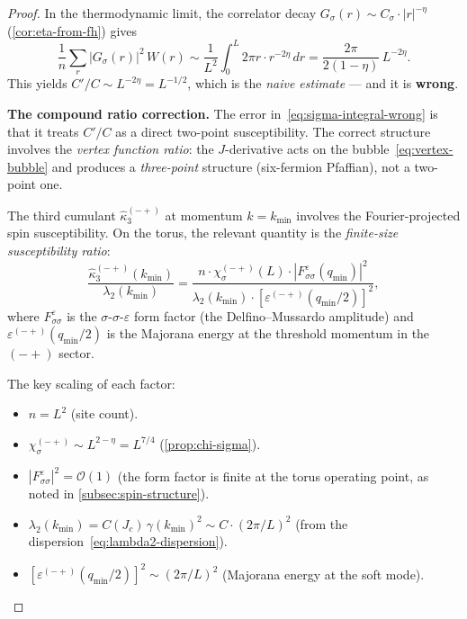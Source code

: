 \documentclass[11pt]{article}
\theoremstyle{definition}
\theoremstyle{remark}
\newcommand{\Jc}{J_c}
\newcommand{\cO}{\mathcal{O}}
\begin{document}
\begin{proof}
In the thermodynamic limit, the correlator decay
$G_\sigma(r) \sim C_\sigma \cdot |r|^{-\eta}$
(\cref{cor:eta-from-fh}) gives
\begin{equation}
  \frac{1}{n}\sum_r |G_\sigma(r)|^2\,W(r)
    \sim \frac{1}{L^2}\int_0^L 2\pi r\cdot
    r^{-2\eta}\,dr = \frac{2\pi}{2(1-\eta)}\,
    L^{-2\eta}.
  \label{eq:sigma-integral-wrong}
\end{equation}
This yields $C'/C \sim L^{-2\eta} = L^{-1/2}$, which is
the \emph{naive estimate} --- and it is \textbf{wrong}.

\textbf{The compound ratio correction.}
The error in~\eqref{eq:sigma-integral-wrong} is that it
treats $C'/C$ as a direct two-point susceptibility. The
correct structure involves the \emph{vertex function ratio}:
the $J$-derivative acts on the bubble~\eqref{eq:vertex-bubble}
and produces a \emph{three-point} structure (six-fermion
Pfaffian), not a two-point one.

The third cumulant $\hat{\kappa}_3^{(-+)}$ at momentum
$k = k_{\min}$ involves the Fourier-projected spin
susceptibility. On the torus, the relevant quantity is the
\emph{finite-size susceptibility ratio}:
\begin{equation}
  \frac{\hat{\kappa}_3^{(-+)}(k_{\min})}{\lambda_2(k_{\min})}
    = \frac{n \cdot \chi_\sigma^{(-+)}(L) \cdot
    |F_{\sigma\sigma}^\varepsilon(q_{\min})|^2}
    {\lambda_2(k_{\min}) \cdot
    [\varepsilon^{(-+)}(q_{\min}/2)]^2},
  \label{eq:vertex-ratio}
\end{equation}
where $F_{\sigma\sigma}^\varepsilon$ is the
$\sigma$-$\sigma$-$\varepsilon$ form factor (the
Delfino--Mussardo amplitude) and
$\varepsilon^{(-+)}(q_{\min}/2)$ is the Majorana energy
at the threshold momentum in the $(-+)$ sector.

The key scaling of each factor:
\begin{itemize}
  \item $n = L^2$ (site count).
  \item $\chi_\sigma^{(-+)} \sim L^{2-\eta} = L^{7/4}$
    (\cref{prop:chi-sigma}).
  \item $|F_{\sigma\sigma}^\varepsilon|^2 = \cO(1)$
    (the form factor is finite at the torus operating
    point, as noted in \cref{subsec:spin-structure}).
  \item $\lambda_2(k_{\min}) = C(\Jc)\,\gamma(k_{\min})^2
    \sim C \cdot (2\pi/L)^2$ (from the
    dispersion~\eqref{eq:lambda2-dispersion}).
  \item $[\varepsilon^{(-+)}(q_{\min}/2)]^2
    \sim (2\pi/L)^2$ (Majorana energy at the soft mode).
\end{itemize}


\end{proof}
\end{document}
